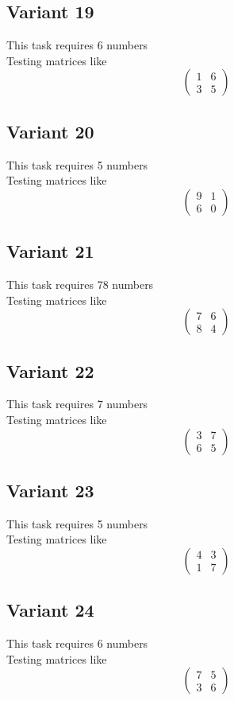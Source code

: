 \documentclass[11pt]{article}
\begin{document}
\subsection*{Variant 19}
This task requires 6 numbers\\
Testing matrices like \[ \begin{pmatrix} 1 & 6\\ 3 & 5 \end{pmatrix} \]

\subsection*{Variant 20}
This task requires 5 numbers\\
Testing matrices like \[ \begin{pmatrix} 9 & 1\\ 6 & 0 \end{pmatrix} \]

\subsection*{Variant 21}
This task requires 78 numbers\\
Testing matrices like \[ \begin{pmatrix} 7 & 6\\ 8 & 4 \end{pmatrix} \]

\subsection*{Variant 22}
This task requires 7 numbers\\
Testing matrices like \[ \begin{pmatrix} 3 & 7\\ 6 & 5 \end{pmatrix} \]

\subsection*{Variant 23}
This task requires 5 numbers\\
Testing matrices like \[ \begin{pmatrix} 4 & 3\\ 1 & 7 \end{pmatrix} \]

\subsection*{Variant 24}
This task requires 6 numbers\\
Testing matrices like \[ \begin{pmatrix} 7 & 5\\ 3 & 6 \end{pmatrix} \]
\end{document}
